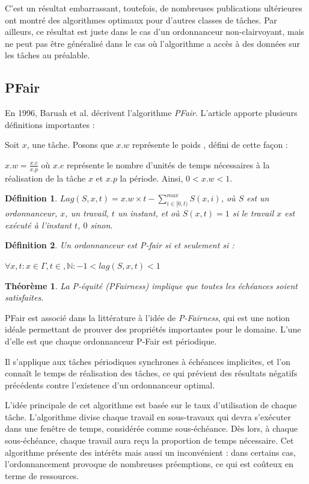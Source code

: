 \documentclass[11pt,a4paper,oneside]{report}
\newtheorem{mydef}{Définition}
\newtheorem{mytheorem}{Théorème}
\begin{document}
	C'est un résultat embarrassant, toutefois, de nombreuses publications ultérieures ont montré des algorithmes 
	optimaux pour d'autres classes de tâches. 
	Par ailleurs, ce résultat est juste dans le cas d'un ordonnanceur non-clairvoyant, 
	mais ne peut pas être généralisé dans le cas où 
	l'algorithme a accès à des données sur les tâches au préalable.
	
	\subsection{PFair}
	En 1996, Baruah et al. décrivent l'algorithme \textit{PFair}. \cite{baruah_proportionate_1996}
	L'article apporte plusieurs définitions importantes :
	
	
	Soit $x$, une tâche. 
	Posons que $x.w$ représente le \og poids\fg{} , défini de cette façon : 
	
	$x.w = \frac{x.e}{x.p}$ où
	$x.e$ représente le nombre d'unités de temps nécessaires à la réalisation de la tâche 
	$x$	et $x.p$ la période. Ainsi, $0 < x.w < 1$.
	
	\begin{mydef}
		$Lag(S, x, t) = x.w \times t - \sum_{i\in[0,t)}^{max} S(x, i)$, où 
		$S$ est un ordonnanceur, $x$, un travail, $t$ un instant, et où $S(x, t) = 1$ si 
		le travail $x$ est exécuté à l'instant $t$, $0$ sinon.
	\end{mydef}
	\begin{mydef}
		Un ordonnanceur est P-fair si et seulement si :
		
		
		$\forall x, t : x \in \Gamma, t\in , \mathbb{N} : -1 < lag(S,x,t) < 1$
	\end{mydef}
	\begin{mytheorem}
		La P-équité (PFairness) implique que toutes les échéances soient satisfaites.
	\end{mytheorem}
	
	PFair est associé dans la littérature à l'idée de \textit{P-Fairness}, qui est une notion 
	idéale permettant de prouver des propriétés importantes pour le domaine. 
	L'une d'elle est que chaque ordonnanceur P-Fair est périodique. \medskip
	
	Il s'applique aux tâches périodiques synchrones à échéances implicites, 
	et l'on connaît le temps de réalisation des tâches, 
	ce qui prévient des résultats négatifs précédents contre 
	l'existence d'un ordonnanceur optimal.\medskip
	
	L'idée principale de cet algorithme est basée sur le taux d'utilisation de chaque tâche. 
	L'algorithme divise chaque travail en sous-travaux qui devra s'exécuter dans une fenêtre de temps, 
	considérée comme sous-échéance. Dès lors, à chaque sous-échéance, 
	chaque travail aura reçu la proportion de temps nécessaire. 
	Cet algorithme présente des intérêts mais aussi un inconvénient : dans certains cas, 
	l'ordonnancement provoque de nombreuses préemptions, ce qui est coûteux en terme de ressources.\medskip
	
\end{document}

